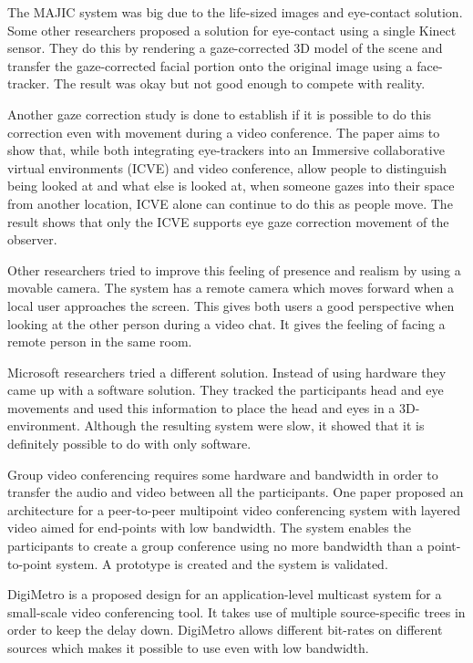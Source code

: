 \documentclass[12pt, titlepage]{article}
\begin{document}
The MAJIC system was big due to the life-sized images and eye-contact solution. Some other researchers proposed a solution for eye-contact using a single Kinect sensor\cite{20}. They do this by rendering a gaze-corrected 3D model of the scene and transfer the gaze-corrected facial portion onto the original image using a face- tracker. The result was okay but not good enough to compete with reality.

Another gaze correction study is done to establish if it is possible to do this correction even with movement during a video conference\cite{21}. The paper aims to show that, while both integrating eye-trackers into an Immersive collaborative virtual
environments (ICVE) and video conference, allow people to distinguish being looked at and what else is looked at, when someone gazes into their space from another location, ICVE alone can continue to do this as people move. The result shows that only the ICVE supports eye gaze correction movement of the observer.

Other researchers tried to improve this feeling of presence and realism by using a movable camera\cite{22}. The system has a remote camera which moves forward when a local user approaches the screen. This gives both users a good perspective when looking at the other person during a video chat. It gives the feeling of facing a remote person in the same room.

Microsoft researchers tried a different solution. Instead of using hardware they came up with a software solution\cite{23}. They tracked the participants head and eye movements and used this information to place the head and eyes in a 3D-environment. Although the resulting system were slow, it showed that it is definitely possible to do with only software.

Group video conferencing requires some hardware and bandwidth in order to transfer the audio and video between all the participants.
One paper proposed an architecture for a peer-to-peer multipoint video conferencing system with layered video aimed for end-points with low bandwidth\cite{24}. The system enables the participants to create a group conference using no more bandwidth than a point-to-point system. A prototype is created and the system is validated.

DigiMetro\cite{25} is a proposed design for an application-level multicast system for a small-scale video conferencing tool. It takes use of multiple source-specific trees in order to keep the delay down. DigiMetro allows different bit-rates on different sources which makes it possible to use even with low bandwidth.
\end{document}
